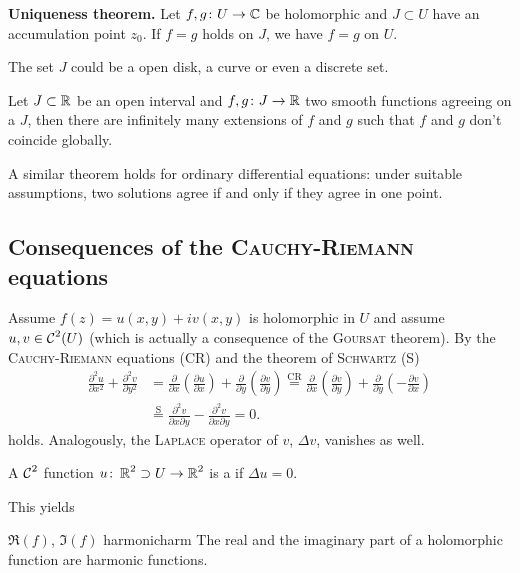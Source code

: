 \documentclass[a4paper,english]{article}
\begin{document}
\textbf{Uniqueness theorem.}
Let $f,g \colon U \to \operatorname{\mathbb{C}}$ be holomorphic and $J \subset U$ have an accumulation point $z_0$.
If $f = g$ holds on $J$, we have $f = g$ on $U$.

The set $J$ could be a open disk, a curve or even a discrete set.

\begin{cexample}
    Let $J \subset \operatorname{\mathbb{R}}$ be an open interval and $f,g \colon J \to \operatorname{\mathbb{R}}$ two smooth functions agreeing on a $J$, then there are infinitely many extensions of $f$ and $g$ such that $f$ and $g$ don't coincide globally.
\end{cexample}

A similar theorem holds for ordinary differential equations: under suitable assumptions, two solutions agree if and only if they agree in one point.


\subsection{Consequences of the \textsc{Cauchy-Riemann} equations}
Assume $f(z) = u(x, y) + i v(x, y)$ is holomorphic in $U$ and assume $u, v \in \operatorname{\mathcal{C}}^2(U)$ (which is actually a consequence of the \textsc{Goursat} theorem).
By the \textsc{Cauchy-Riemann} equations (CR) and the theorem of \textsc{Schwartz} (S)
\begin{align*}
    \frac{\partial^2 u}{\partial x^2} + \frac{\partial^2 v}{\partial y^2}
    & = \frac{\partial}{\partial x} \left(\frac{\partial u}{\partial x}\right) + \frac{\partial}{\partial y} \left(\frac{\partial v}{\partial y}\right)
    \overset{\text{CR}}{=} \frac{\partial}{\partial x} \left(\frac{\partial v}{\partial y}\right) + \frac{\partial}{\partial y} \left(-\frac{\partial v}{\partial x}\right) \\
    & \overset{\text{S}}{=}
    \frac{\partial^2 v}{\partial x \partial y} - \frac{\partial^2 v}{\partial x \partial y}
    = 0.
\end{align*}
holds.
Analogously, the \textsc{Laplace} operator of $v$, $\Delta v$, vanishes as well.

\begin{defn}
    A $\operatorname{\mathcal{C}}^2$ function $u \colon \operatorname{\mathbb{R}}^2 \supset U \to \operatorname{\mathbb{R}}^2$ is a   if $\Delta u = 0$.
\end{defn}

This yields
\begin{thm}{$\Re(f)$, $\Im(f)$ harmonic}{harm}
    The real and the imaginary part of a holomorphic function are harmonic functions.
\end{thm}
\end{document}
